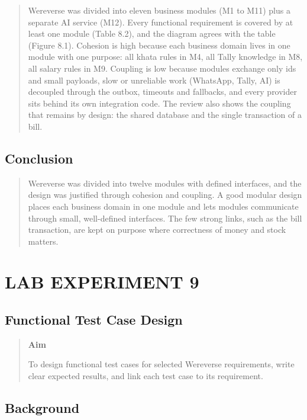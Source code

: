 \documentclass[12pt,a4paper]{article}
\begin{document}
\begin{quote}
Wereverse was divided into eleven business modules (M1 to M11) plus a
separate AI service (M12). Every functional requirement is covered by at
least one module (Table 8.2), and the diagram agrees with the table
(Figure 8.1). Cohesion is high because each business domain lives in one
module with one purpose: all khata rules in M4, all Tally knowledge in
M8, all salary rules in M9. Coupling is low because modules exchange
only ids and small payloads, slow or unreliable work (WhatsApp, Tally,
AI) is decoupled through the outbox, timeouts and fallbacks, and every
provider sits behind its own integration code. The review also shows the
coupling that remains by design: the shared database and the single
transaction of a bill.
\end{quote}

\subsection{Conclusion}\label{conclusion-7}

\begin{quote}
Wereverse was divided into twelve modules with defined interfaces, and
the design was justified through cohesion and coupling. A good modular
design places each business domain in one module and lets modules
communicate through small, well-defined interfaces. The few strong
links, such as the bill transaction, are kept on purpose where
correctness of money and stock matters.
\end{quote}

\clearpage
\section{LAB EXPERIMENT 9}\label{lab-experiment-9}

\subsection{Functional Test Case
Design}\label{functional-test-case-design}

\begin{quote}
\textbf{Aim}

To design functional test cases for selected Wereverse requirements,
write clear expected results, and link each test case to its
requirement.
\end{quote}

\subsection{Background}\label{background-1}
\end{document}

